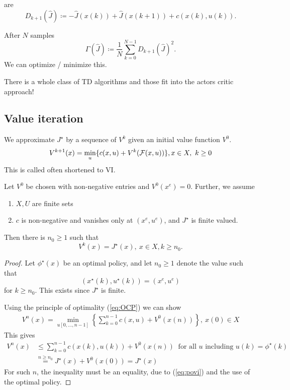  are 
\[D_{k+1}(\hat{J})\coloneqq -\hat{J}(x(k))+\hat{J}(x(k+1))+c(x(k),u(k)).\]

After \(N\) samples 
\[\Gamma(\hat{J})\coloneqq \frac{1}{N}\sum_{k=0}^{N-1} D_{k+1}(\hat{J})^2.\]
We can optimize / minimize this.

There is a whole class of TD algorithms and those fit into the actors critic approach!


\subsection{Value iteration}

We approximate \(J^\star\) by a sequence of \(V^k\) given an initial value function \(V^0\).
\[V^{k+1}(x)=\min_{u}\{c(x,u)+V^k(\mathcal{F}(x,u))\}, x\in X,\ k\geq 0\]
This is called  often shortened to VI.

\begin{proposition}\label{prop:1.15}
    Let \(V^0\) be chosen with non-negative entries and \(V^0(x^e)=0\). Further,
    we assume
    \begin{enumerate}
        \item \(X,U\) are finite sets 
        \item \(c\) is non-negative and vanishes only at \((x^e,u^e)\), and \(J^\star\) is finite valued.
    \end{enumerate}
    Then there is \(n_0\geq 1\) such that 
    \[V^k(x)=J^\star(x), \ x\in X,k\geq n_0.\]
\end{proposition}

\begin{proof}
    Let \(\phi^\star(x)\) be an optimal policy, and let 
    \(n_0\geq 1\) denote the value such that 
    \[(x^\star(k),u^\star(k))=(x^e,u^e)\]
    for \(k\geq n_0\). This exists since \(J^\star\) is finite.

    Using the principle of optimality (\ref{eq:OCP}) %
     we can show
    \begin{align}\label{eq:povi}
        V^n(x)=\min_{u[0,\dots,n-1]} \left\{\sum_{k=0}^{n-1} c(x,u)+V^0(x(n)) \right\},\ x(0)\in X 
    \end{align}
    This gives 
    \begin{align*}
        V^n(x) & \leq \sum_{k=0}^{n-1}c(x(k),u(k))+V^0(x(n))\ \text{ for all } u \text{ including }u(k)=\phi^\star(k) \\
               &\stackrel{n\geq n_0}{=}J^\star(x)+V^0(x(0))=J^\star(x)
    \end{align*}
    For such \(n\), the inequality must be an equality, due to (\ref{eq:povi}) and the use 
    of the optimal policy.
\end{proof}

